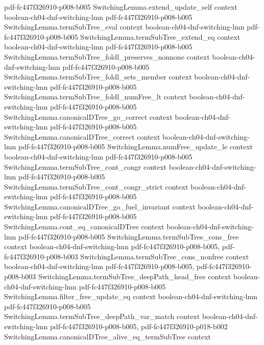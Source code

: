 \begin{theorem}
  {pdf-fc447f326910-p008-b005}
\proofstep
  {SwitchingLemma.extend_update_self}
  {context}
  {boolean-ch04-dnf-switching-lmn}
  {pdf-fc447f326910-p008-b005}
\proofstep
  {SwitchingLemma.termSubTree_eval}
  {context}
  {boolean-ch04-dnf-switching-lmn}
  {pdf-fc447f326910-p008-b005}
\proofstep
  {SwitchingLemma.termSubTree_extend_eq}
  {context}
  {boolean-ch04-dnf-switching-lmn}
  {pdf-fc447f326910-p008-b005}
\proofstep
  {SwitchingLemma.termSubTree_foldl_preserves_nonnone}
  {context}
  {boolean-ch04-dnf-switching-lmn}
  {pdf-fc447f326910-p008-b005}
\proofstep
  {SwitchingLemma.termSubTree_foldl_sets_member}
  {context}
  {boolean-ch04-dnf-switching-lmn}
  {pdf-fc447f326910-p008-b005}
\proofstep
  {SwitchingLemma.termSubTree_foldl_numFree_lt}
  {context}
  {boolean-ch04-dnf-switching-lmn}
  {pdf-fc447f326910-p008-b005}
\proofstep
  {SwitchingLemma.canonicalDTree_go_correct}
  {context}
  {boolean-ch04-dnf-switching-lmn}
  {pdf-fc447f326910-p008-b005}
\proofstep
  {SwitchingLemma.canonicalDTree_correct}
  {context}
  {boolean-ch04-dnf-switching-lmn}
  {pdf-fc447f326910-p008-b005}
\proofstep
  {SwitchingLemma.numFree_update_le}
  {context}
  {boolean-ch04-dnf-switching-lmn}
  {pdf-fc447f326910-p008-b005}
\proofstep
  {SwitchingLemma.termSubTree_cont_congr}
  {context}
  {boolean-ch04-dnf-switching-lmn}
  {pdf-fc447f326910-p008-b005}
\proofstep
  {SwitchingLemma.termSubTree_cont_congr_strict}
  {context}
  {boolean-ch04-dnf-switching-lmn}
  {pdf-fc447f326910-p008-b005}
\proofstep
  {SwitchingLemma.canonicalDTree_go_fuel_invariant}
  {context}
  {boolean-ch04-dnf-switching-lmn}
  {pdf-fc447f326910-p008-b005}
\proofstep
  {SwitchingLemma.cont_eq_canonicalDTree}
  {context}
  {boolean-ch04-dnf-switching-lmn}
  {pdf-fc447f326910-p008-b005}
\proofstep
  {SwitchingLemma.termSubTree_cons_free}
  {context}
  {boolean-ch04-dnf-switching-lmn}
  {pdf-fc447f326910-p008-b005,
    pdf-fc447f326910-p008-b003}
\proofstep
  {SwitchingLemma.termSubTree_cons_nonfree}
  {context}
  {boolean-ch04-dnf-switching-lmn}
  {pdf-fc447f326910-p008-b005,
    pdf-fc447f326910-p008-b003}
\proofstep
  {SwitchingLemma.termSubTree_deepPath_head_free}
  {context}
  {boolean-ch04-dnf-switching-lmn}
  {pdf-fc447f326910-p008-b005}
\proofstep
  {SwitchingLemma.filter_free_update_eq}
  {context}
  {boolean-ch04-dnf-switching-lmn}
  {pdf-fc447f326910-p008-b005}
\proofstep
  {SwitchingLemma.termSubTree_deepPath_var_match}
  {context}
  {boolean-ch04-dnf-switching-lmn}
  {pdf-fc447f326910-p008-b005,
    pdf-fc447f326910-p018-b002}
\proofstep
  {SwitchingLemma.canonicalDTree_alive_eq_termSubTree}
  {context}

\end{theorem}

